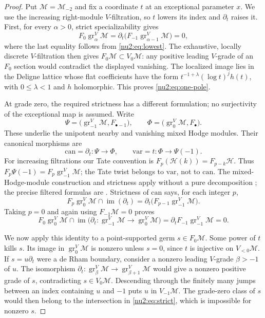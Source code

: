 \begin{proof}
Put $\mathcal M=\mathcal M_{-2}$ and fix a coordinate $t$ at an
exceptional parameter $x$.  We use the increasing right-module
$V$-filtration, so $t$ lowers its index and $\partial_t$ raises it.
First, for every $\alpha>0$, strict specializability gives
\[
 F_0\operatorname{gr}_\alpha^V\mathcal M
 =\partial_t\bigl(F_{-1}\operatorname{gr}_{\alpha-1}^V
                    \mathcal M\bigr)=0,
\]
where the last equality follows from \eqref{nu2:eq:lowest}.
The exhaustive, locally discrete $V$-filtration then gives
$F_0\mathcal M\subset V_0\mathcal M$: any positive leading
$V$-grade of an $F_0$ section would contradict the displayed vanishing.
The localized image lies in the Deligne lattice whose flat coefficients
have the form $t^{-1+\lambda}(\log t)^jh(t)$, with
$0\le\lambda<1$ and $h$ holomorphic.  This proves
\eqref{nu2:eq:one-pole}.

At grade zero, the required strictness has a different formulation;
no surjectivity of the exceptional map is assumed.  Write
\[
 \Psi=\bigl(\operatorname{gr}_{-1}^V\mathcal M,
                 F_{\bullet-1}\bigr),\qquad
 \Phi=\bigl(\operatorname{gr}_0^V\mathcal M,F_\bullet\bigr).
\]
These underlie the unipotent nearby and vanishing mixed Hodge modules.
Their canonical morphisms are
\[
 \mathrm{can}=\partial_t:\Psi\longrightarrow\Phi,
 \qquad
 \mathrm{var}=t:\Phi\longrightarrow\Psi(-1).
\]
For increasing filtrations our Tate convention is
$F_p(\mathcal H(k))=F_{p-k}\mathcal H$.  Thus
$F_p\Psi(-1)=F_p\operatorname{gr}_{-1}^V\mathcal M$;
the Tate twist belongs to $\mathrm{var}$, not to $\mathrm{can}$.
The mixed-Hodge-module construction and strictness apply without a
pure decomposition \cite{Saito1990}; the precise filtered formulas
are \cite[v1, (9.3), Sections~20--21, and (30.3)--(30.4)]{Schnell2014}.
Strictness of $\mathrm{can}$ says, for each integer $p$,
\[
 F_p\operatorname{gr}_0^V\mathcal M\cap\operatorname{im}(\partial_t)
 =\partial_t\bigl(F_{p-1}\operatorname{gr}_{-1}^V\mathcal M\bigr).
\]
Taking $p=0$ and again using $F_{-1}\mathcal M=0$ proves
\begin{equation}\label{nu2:eq:strict}
 F_0\operatorname{gr}_0^V\mathcal M\cap
 \operatorname{im}\bigl(\partial_t:
 \operatorname{gr}_{-1}^V\mathcal M\to
 \operatorname{gr}_0^V\mathcal M\bigr)
 =\partial_t F_{-1}\operatorname{gr}_{-1}^V\mathcal M=0.
\end{equation}

We now apply this identity to a point-supported germ
$s\in F_0\mathcal M$.  Some power of $t$ kills $s$.  Its image in
$\operatorname{gr}_0^V\mathcal M$ is nonzero unless $s=0$, since
$t$ is injective on $V_{<0}\mathcal M$.
If $s=u\partial_t$ were a de Rham boundary, consider a nonzero leading
$V$-grade $\beta>-1$ of $u$.  The isomorphism
$\partial_t:\operatorname{gr}_\beta^V\mathcal M\to
\operatorname{gr}_{\beta+1}^V\mathcal M$ would give a nonzero
positive grade of $s$, contradicting $s\in V_0\mathcal M$.
Descending through the finitely many jumps between an index containing
$u$ and $-1$ puts $u$ in $V_{-1}\mathcal M$.  The grade-zero class
of $s$ would then belong to the intersection in
\eqref{nu2:eq:strict}, which is impossible for nonzero $s$.


\end{proof}
